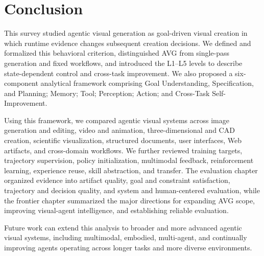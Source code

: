 \section{Conclusion}
\label{sec:conclusion}
This survey studied agentic visual generation as goal-driven visual creation in which runtime evidence changes subsequent creation decisions. We defined and formalized this behavioral criterion, distinguished AVG from single-pass generation and fixed workflows, and introduced the L1--L5 levels to describe state-dependent control and cross-task improvement. We also proposed a six-component analytical framework comprising Goal Understanding, Specification, and Planning; Memory; Tool; Perception; Action; and Cross-Task Self-Improvement.

Using this framework, we compared agentic visual systems across image generation and editing, video and animation, three-dimensional and CAD creation, scientific visualization, structured documents, user interfaces, Web artifacts, and cross-domain workflows. We further reviewed training targets, trajectory supervision, policy initialization, multimodal feedback, reinforcement learning, experience reuse, skill abstraction, and transfer. The evaluation chapter organized evidence into artifact quality, goal and constraint satisfaction, trajectory and decision quality, and system and human-centered evaluation, while the frontier chapter summarized the major directions for expanding AVG scope, improving visual-agent intelligence, and establishing reliable evaluation.

Future work can extend this analysis to broader and more advanced agentic visual systems, including multimodal, embodied, multi-agent, and continually improving agents operating across longer tasks and more diverse environments.
